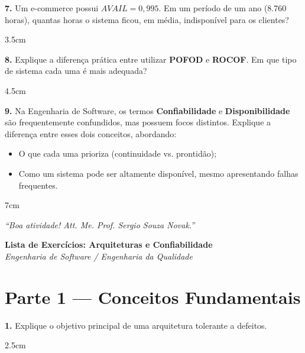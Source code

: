 \documentclass[12pt,a4paper]{report}
\begin{document}
\vspace{0.5cm}

\textbf{7.} Um e-commerce possui $AVAIL = 0,995$. Em um período de um ano (8.760 horas), quantas horas o sistema ficou, em média, indisponível para os clientes?
\begin{resposta}{3.5cm}
\end{resposta}

\vspace{0.5cm}

\textbf{8.} Explique a diferença prática entre utilizar \textbf{POFOD} e \textbf{ROCOF}. Em que tipo de sistema cada uma é mais adequada?
\begin{resposta}{4.5cm}
\end{resposta}

\vspace{0.8cm}
\vspace{0.5cm}

\textbf{9.} Na Engenharia de Software, os termos \textbf{Confiabilidade} e \textbf{Disponibilidade} são frequentemente confundidos, mas possuem focos distintos. Explique a diferença entre esses dois conceitos, abordando:
\begin{itemize}
    \item O que cada uma prioriza (continuidade vs. prontidão);
    \item Como um sistema pode ser altamente disponível, mesmo apresentando falhas frequentes.
\end{itemize}

\begin{resposta}{7cm}
\end{resposta}
\begin{center}
    \textit{“Boa atividade! Att. Me. Prof. Sergio Souza Novak.”}
\end{center}

\begin{center}
  {\Large \textbf{Lista de Exercícios: Arquiteturas e Confiabilidade}}\\[0.2cm]
  \textit{Engenharia de Software / Engenharia da Qualidade}
\end{center}

\vspace{0.4cm}

\section*{Parte 1 — Conceitos Fundamentais}

\textbf{1.} Explique o objetivo principal de uma arquitetura tolerante a defeitos.
\begin{resposta}{2.5cm}
\end{resposta}
\end{document}
